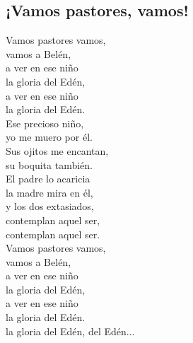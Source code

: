 \subsection{¡Vamos pastores, vamos!}

\begin{center}

{\Large
Vamos pastores vamos,\\
vamos a Belén,\\
a ver en ese niño\\
la gloria del Edén,\\
a ver en ese niño\\
la gloria del Edén.\\
\vspace{1em}
Ese precioso niño,\\
yo me muero por él.\\
Sus ojitos me encantan,\\
su boquita también.\\
El padre lo acaricia\\
la madre mira en él,\\
y los dos extasiados,\\
contemplan aquel ser,\\
contemplan aquel ser.\\
\vspace{1em}
Vamos pastores vamos,\\
vamos a Belén,\\
a ver en ese niño\\
la gloria del Edén,\\
a ver en ese niño\\
la gloria del Edén.\\
la gloria del Edén, del Edén...\\
}
\end{center}
